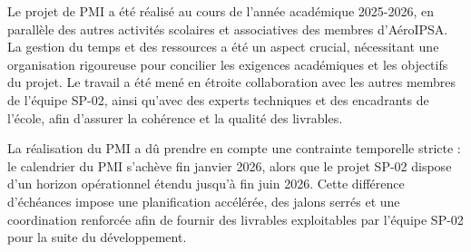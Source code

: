 Le projet de \acrshort{PMI} a été réalisé au cours de l'année académique 2025-2026, en parallèle des autres activités scolaires
et associatives des membres d'AéroIPSA. La gestion du temps et des ressources a été un aspect crucial, nécessitant une
organisation rigoureuse pour concilier les exigences académiques et les objectifs du projet. Le travail a été mené en étroite
collaboration avec les autres membres de l'équipe SP-02, ainsi qu'avec des experts techniques et des encadrants de l'école, afin
d'assurer la cohérence et la qualité des livrables.

La réalisation du \acrshort{PMI} a dû prendre en compte une contrainte temporelle stricte : le calendrier du \acrshort{PMI}
s'achève fin janvier 2026, alors que le projet SP-02 dispose d'un horizon opérationnel étendu jusqu'à fin juin 2026. Cette
différence d'échéances impose une planification accélérée, des jalons serrés et une coordination renforcée afin de fournir des
livrables exploitables par l'équipe SP-02 pour la suite du développement.

\newpage
